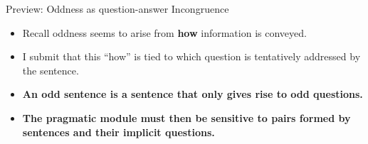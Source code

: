 \documentclass[10pt]{beamer}
\newcommand{\Paris}{\textbf{\textcolor{orange}{Paris}}}
\newcommand{\France}{\textbf{\textcolor{blue}{France}}}
\begin{document}
\begin{frame}{Preview: Oddness as question-answer Incongruence}
	\begin{itemize}
		\item Recall oddness seems to arise from \textbf{how} information is conveyed.\pause
		\item I submit that this ``how'' is tied to which question is tentatively addressed by the sentence.\pause
		\item \textbf{An odd sentence is a sentence that only gives rise to odd questions.}\pause
	\end{itemize}
	\begin{center}
	\end{center}\pause
	\begin{itemize}
		\item \textbf{The pragmatic module must then be sensitive to pairs formed by sentences and their implicit questions.}
	\end{itemize}
\end{frame}
\end{document}
